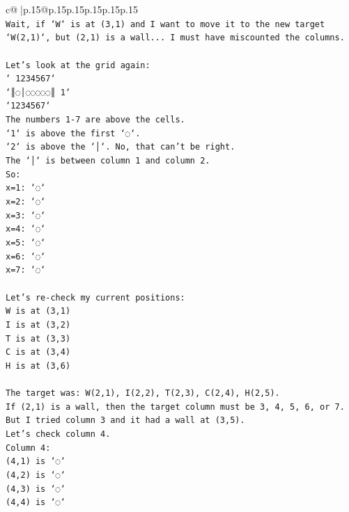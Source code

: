 \documentclass{article}
\begin{document}
{\begin{supertabular}{c@{$\;$}|p{.15\linewidth}@{}p{.15\linewidth}p{.15\linewidth}p{.15\linewidth}p{.15\linewidth}p{.15\linewidth}}
{{{\\ 
\texttt{Wait, if `W` is at (3,1) and I want to move it to the new target `W(2,1)`, but (2,1) is a wall... I must have miscounted the columns.} \\
\\ 
\texttt{Let's look at the grid again:} \\
\texttt{` 1234567`} \\
\texttt{`║◌│◌◌◌◌◌║ 1`} \\
\texttt{`1234567`} \\
\texttt{The numbers 1{-}7 are above the cells.} \\
\texttt{`1` is above the first `◌`.} \\
\texttt{`2` is above the `│`. No, that can't be right.} \\
\texttt{The `│` is between column 1 and column 2.} \\
\texttt{So:} \\
\texttt{x=1: `◌`} \\
\texttt{x=2: `◌`} \\
\texttt{x=3: `◌`} \\
\texttt{x=4: `◌`} \\
\texttt{x=5: `◌`} \\
\texttt{x=6: `◌`} \\
\texttt{x=7: `◌`} \\
\\ 
\texttt{Let's re{-}check my current positions:} \\
\texttt{W is at (3,1)} \\
\texttt{I is at (3,2)} \\
\texttt{T is at (3,3)} \\
\texttt{C is at (3,4)} \\
\texttt{H is at (3,6)} \\
\\ 
\texttt{The target was: W(2,1), I(2,2), T(2,3), C(2,4), H(2,5).} \\
\texttt{If (2,1) is a wall, then the target column must be 3, 4, 5, 6, or 7.} \\
\texttt{But I tried column 3 and it had a wall at (3,5).} \\
\texttt{Let's check column 4.} \\
\texttt{Column 4:} \\
\texttt{(4,1) is `◌`} \\
\texttt{(4,2) is `◌`} \\
\texttt{(4,3) is `◌`} \\
\texttt{(4,4) is `◌`} \\
}}}
\end{supertabular}}
\end{document}
